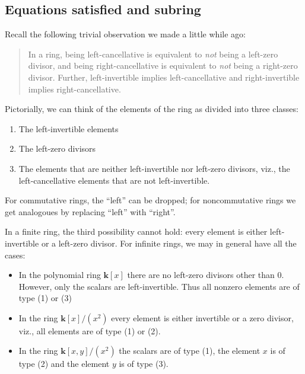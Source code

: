\documentclass[a4paper]{amsart}
\newcommand{\field}{\mathbf{k}}
\begin{document}
\subsection{Equations satisfied and subring}

Recall the following trivial observation we made a little while ago:

\begin{quote}
  In a ring, being left-cancellative is equivalent to {\em not} being
  a left-zero divisor, and being right-cancellative is equivalent to
  {\em not} being a right-zero divisor. Further, left-invertible
  implies left-cancellative and right-invertible implies
  right-cancellative.
\end{quote}

Pictorially, we can think of the elements of the ring as divided into
three classes:

\begin{enumerate}

\item The left-invertible elements

\item The left-zero divisors

\item The elements that are neither left-invertible nor left-zero
  divisors, viz., the left-cancellative elements that are not left-invertible.

\end{enumerate}

For commutative rings, the ``left'' can be dropped; for noncommutative
rings we get analogoues by replacing ``left'' with ``right''.

In a finite ring, the third possibility cannot hold: every element is
either left-invertible or a left-zero divisor. For infinite rings, we
may in general have all the cases:

\begin{itemize}

\item In the polynomial ring $\field[x]$ there are no left-zero
  divisors other than $0$. However, only the scalars are
  left-invertible. Thus all nonzero elements are of type (1) or (3)

\item In the ring $\field[x]/(x^2)$ every element is either invertible
  or a zero divisor, viz., all elements are of type (1) or (2).

\item In the ring $\field[x,y]/(x^2)$ the scalars are of type (1), the
  element $x$ is of type (2) and the element $y$ is of type (3).

\end{itemize}
\end{document}
